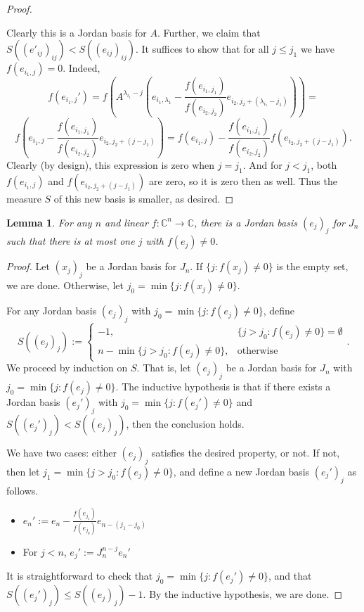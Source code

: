 \documentclass[12pt,psamsfonts]{article}
\newtheorem{lemma}[theorem]{Lemma}
\begin{document}
\begin{proof}
\begin{itemize}
    \end{itemize}
    Clearly this is a Jordan basis for \(A\).
    Further, we claim that \(S((e'_{ij})_{ij})  < S((e_{ij})_{ij})\).
    It suffices to show that for all \(j \leq j_1\) we have  \(f (e_{i_1,j}) = 0\).
    Indeed,
    \[f (e_{i_1,j}') = f\left(A^{\lambda_{i_1} - j}\left(e_{i_1, \lambda_1} - \frac{f(e_{i_1, j_1})}{f(e_{i_2, j_2})}e_{i_2, j_2 + (\lambda_{i_1} - j_1)}\right)\right) =\]
    \[f\left(e_{i_1, j} - \frac{f(e_{i_1, j_1})}{f(e_{i_2, j_2})} e_{i_2, j_2 + (j - j_1)}\right) = f(e_{i_1, j}) - \frac{f(e_{i_1, j_1})}{f(e_{i_2, j_2})} f(e_{i_2, j_2 + (j - j_1)}).\]
    Clearly (by design), this expression is zero when \(j = j_1\).
    And for \(j < j_1\), both \(f(e_{i_1, j})\) and \(f(e_{i_2, j_2 + (j - j_1)})\) are zero, so it is zero then as well.
    Thus the measure \(S\) of this new basis is smaller, as desired.
\end{proof}

\begin{lemma}\label{normalization_helper_two}
    For any \(n\) and linear \(f : \mathbb{C}^n \to \mathbb{C}\), there is a Jordan basis \((e_j)_j\) for \(J_n\) such that there is at most one \(j\) with \(f(e_j) \neq 0\).
\end{lemma}
\begin{proof}
    Let \((x_j)_j\) be a Jordan basis for \(J_n\).
    If \(\{j : f(x_j) \neq 0\}\) is the empty set, we are done.
    Otherwise, let \(j_0 = \min\{j : f(x_j) \neq 0\}\).
    \par For any Jordan basis \((e_j)_j\) with \(j_0 = \min\{j : f(e_j) \neq 0\}\), define 
    \[S((e_j)_j) := \begin{cases}
        -1, & \{j > j_0 : f(e_j) \neq 0\} = \emptyset \\
        n - \min\{j > j_0 : f(e_j) \neq 0\}, & \textrm{otherwise}
    \end{cases}.\]
    We proceed by induction on \(S\).
    That is, let \((e_j)_j\) be a Jordan basis for \(J_n\) with \(j_0 = \min\{j : f(e_j) \neq 0\}\).
    The inductive hypothesis is that if there exists a Jordan basis \((e_j')_j\) with \(j_0 = \min\{j : f(e_j') \neq 0\}\) and \(S((e_j')_j) < S((e_j)_j)\), then the conclusion holds.
    \par We have two cases: either \((e_j)_j\) satisfies the desired property, or not.
    If not, then let \(j_1 = \min\{j > j_0 : f(e_j) \neq 0\}\), and define a new Jordan basis \((e_j')_j\) as follows.
    \begin{itemize}
        \item \(e_n' := e_n - \frac{f(e_{j_1})}{f(e_{j_0})} e_{n - (j_1 - j_0)}\)
        \item For \(j < n\), \(e_j' := J_n^{n - j} e_n'\)
    \end{itemize}
    It is straightforward to check that \(j_0 = \min\{j : f(e_j') \neq 0\}\), and that \(S((e_j')_j) \leq S((e_j)_j) - 1\).
    By the inductive hypothesis, we are done.
\end{proof}
\end{document}
